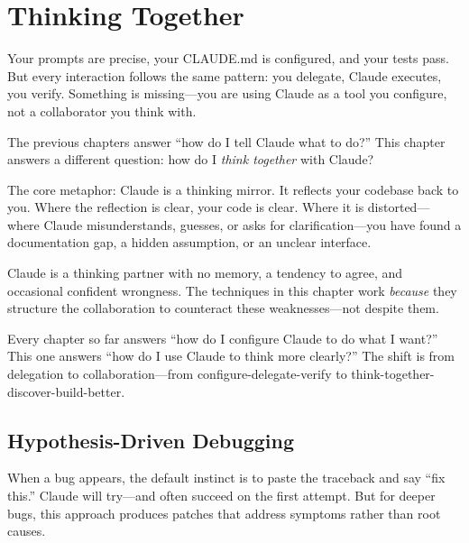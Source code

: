 \chapter{Thinking Together}
\label{ch:thinking-partner}

\begin{itshape}
Your prompts are precise, your CLAUDE.md is configured, and your tests pass.
But every interaction follows the same pattern: you delegate, Claude executes,
you verify. Something is missing---you are using Claude as a tool you configure,
not a collaborator you think with.
\end{itshape}

The previous chapters answer ``how do I tell Claude what to do?''
This chapter answers a different question: how do I \emph{think together}
with Claude?

The core metaphor: Claude is a thinking mirror. It reflects your codebase
back to you. Where the reflection is clear, your code is clear.
Where it is distorted---where Claude misunderstands, guesses, or asks
for clarification---you have found a documentation gap, a hidden assumption,
or an unclear interface.

\begin{warnbox}
Claude is a thinking partner with no memory, a tendency to agree,
and occasional confident wrongness. The techniques in this chapter
work \emph{because} they structure the collaboration to counteract
these weaknesses---not despite them.
\end{warnbox}

\begin{whybox}
Every chapter so far answers ``how do I configure Claude to do what I want?''
This one answers ``how do I use Claude to think more clearly?''
The shift is from delegation to collaboration---from configure-delegate-verify
to think-together-discover-build-better.
\end{whybox}

\section{Hypothesis-Driven Debugging}
\label{sec:hypothesis-debugging}

When a bug appears, the default instinct is to paste the traceback and say
``fix this.'' Claude will try---and often succeed on the first attempt.
But for deeper bugs, this approach produces patches that address symptoms
rather than root causes.

